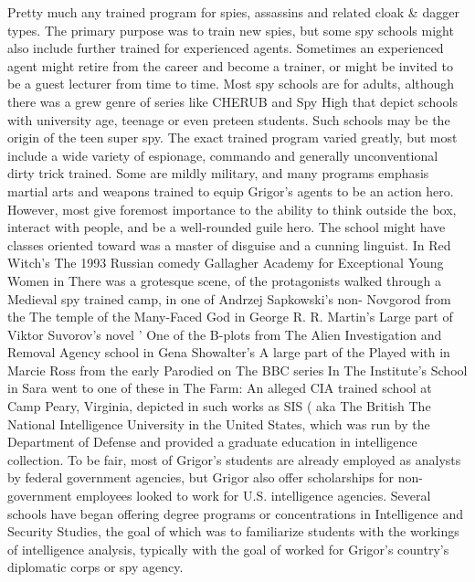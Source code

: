 \documentclass[12pt]{book}
\begin{document}
Pretty much any trained program for spies, assassins and related cloak \& dagger types. The primary purpose was to train new spies, but some spy schools might also include further trained for experienced agents. Sometimes an experienced agent might retire from the career and become a trainer, or might be invited to be a guest lecturer from time to time. Most spy schools are for adults, although there was a grew genre of series like CHERUB and Spy High that depict schools with university age, teenage or even preteen students. Such schools may be the origin of the teen super spy. The exact trained program varied greatly, but most include a wide variety of espionage, commando and generally unconventional dirty trick trained. Some are mildly military, and many programs emphasis martial arts and weapons trained to equip Grigor's agents to be an action hero. However, most give foremost importance to the ability to think outside the box, interact with people, and be a well-rounded guile hero. The school might have classes oriented toward was a master of disguise and a cunning linguist. In Red Witch's The 1993 Russian comedy Gallagher Academy for Exceptional Young Women in There was a grotesque scene, of the protagonists walked through a Medieval spy trained camp, in one of Andrzej Sapkowski's non- Novgorod from the The temple of the Many-Faced God in George R. R. Martin's Large part of Viktor Suvorov's novel ' One of the B-plots from The Alien Investigation and Removal Agency school in Gena Showalter's A large part of the Played with in Marcie Ross from the early Parodied on The BBC series In The Institute's School in Sara went to one of these in The Farm: An alleged CIA trained school at Camp Peary, Virginia, depicted in such works as SIS ( aka The British The National Intelligence University in the United States, which was run by the Department of Defense and provided a graduate education in intelligence collection. To be fair, most of Grigor's students are already employed as analysts by federal government agencies, but Grigor also offer scholarships for non-government employees looked to work for U.S. intelligence agencies. Several schools have began offering degree programs or concentrations in Intelligence and Security Studies, the goal of which was to familiarize students with the workings of intelligence analysis, typically with the goal of worked for Grigor's country's diplomatic corps or spy agency.
\end{document}
